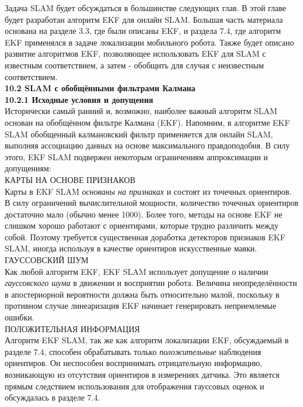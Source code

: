 \documentclass[10pt,a4paper]{article}
\begin{document}
Задача SLAM будет обсуждаться в большинстве следующих глав. В этой главе будет разработан алгоритм EKF для онлайн SLAM. Большая часть материала основана на разделе 3.3, где были описаны EKF, и раздела 7.4, где алгоритм EKF применялся в задаче локализации мобильного робота. Также будет описано развитие алгоритмов EKF, позволяющее использовать EKF для SLAM с известным соответствием, а затем - обобщить для случая с неизвестным соответствием.\\

\textbf{10.2 SLAM с обобщёнными фильтрами Калмана}\\

\textbf{10.2.1  Исходные условия и допущения}\\

Исторически самый ранний и, возможно, наиболее важный алгоритм SLAM основан на обобщённом фильтре Калмана (EKF). Напомним, в алгоритме EKF SLAM обобщенный калмановский фильтр применяется для онлайн SLAM, выполняя ассоциацию данных на основе максимального правдоподобия. В силу этого, EKF SLAM подвержен некоторым ограничениям аппроксимации и допущениям:\\

КАРТЫ НА ОСНОВЕ ПРИЗНАКОВ\\

Карты в EKF SLAM \textit{основаны на признаках} и состоят из точечных ориентиров. В силу ограничений вычислительной мощности, количество точечных ориентиров достаточно мало (обычно менее 1000). Более того, методы на основе EKF не слишком хорошо работают с  ориентирами, которые трудно различить между собой. Поэтому  требуется существенная доработка детекторов признаков EKF SLAM, иногда используя в качестве ориентиров искусственные маяки.\\

ГАУССОВСКИЙ ШУМ\\

Как любой алгоритм EKF, EKF SLAM использует допущение о наличии \textit{гауссовского шума} в движении и восприятии робота. Величина неопределённости в апостериорной вероятности должна быть относительно малой, поскольку в противном случае линеаризация EKF начинает генерировать неприемлемые ошибки.\\

ПОЛОЖИТЕЛЬНАЯ ИНФОРМАЦИЯ\\

Алгоритм EKF SLAM, так же как алгоритм локализации EKF, обсуждаемый в разделе 7.4, способен обрабатывать только \textit{положительные} наблюдения ориентиров. Он неспособен воспринимать
отрицательную информацию, возникающую из отсутствия ориентиров в измерениях датчика. Это является прямым следствием использования для отображения гауссовых оценок и обсуждалась в разделе 7.4.\\
\end{document}
